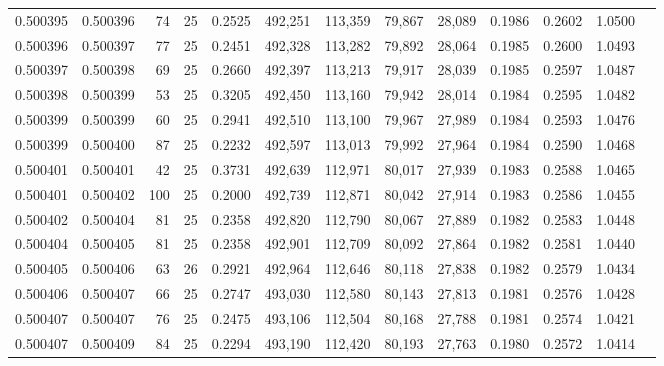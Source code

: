\begin{tabular}{rrrrrrrrrrrrr}
0.500395 & 0.500396 &  74 &  25 &                                     0.2525 & 492,251 & 113,359 &  79,867 &  28,089 & 0.1986 & 0.2602 & 1.0500 \\
0.500396 & 0.500397 &  77 &  25 &                                     0.2451 & 492,328 & 113,282 &  79,892 &  28,064 & 0.1985 & 0.2600 & 1.0493 \\
0.500397 & 0.500398 &  69 &  25 &                                     0.2660 & 492,397 & 113,213 &  79,917 &  28,039 & 0.1985 & 0.2597 & 1.0487 \\
0.500398 & 0.500399 &  53 &  25 &                                     0.3205 & 492,450 & 113,160 &  79,942 &  28,014 & 0.1984 & 0.2595 & 1.0482 \\
0.500399 & 0.500399 &  60 &  25 &                                     0.2941 & 492,510 & 113,100 &  79,967 &  27,989 & 0.1984 & 0.2593 & 1.0476 \\
0.500399 & 0.500400 &  87 &  25 &                                     0.2232 & 492,597 & 113,013 &  79,992 &  27,964 & 0.1984 & 0.2590 & 1.0468 \\
0.500401 & 0.500401 &  42 &  25 &                                     0.3731 & 492,639 & 112,971 &  80,017 &  27,939 & 0.1983 & 0.2588 & 1.0465 \\
0.500401 & 0.500402 & 100 &  25 &                                     0.2000 & 492,739 & 112,871 &  80,042 &  27,914 & 0.1983 & 0.2586 & 1.0455 \\
0.500402 & 0.500404 &  81 &  25 &                                     0.2358 & 492,820 & 112,790 &  80,067 &  27,889 & 0.1982 & 0.2583 & 1.0448 \\
0.500404 & 0.500405 &  81 &  25 &                                     0.2358 & 492,901 & 112,709 &  80,092 &  27,864 & 0.1982 & 0.2581 & 1.0440 \\
0.500405 & 0.500406 &  63 &  26 &                                     0.2921 & 492,964 & 112,646 &  80,118 &  27,838 & 0.1982 & 0.2579 & 1.0434 \\
0.500406 & 0.500407 &  66 &  25 &                                     0.2747 & 493,030 & 112,580 &  80,143 &  27,813 & 0.1981 & 0.2576 & 1.0428 \\
0.500407 & 0.500407 &  76 &  25 &                                     0.2475 & 493,106 & 112,504 &  80,168 &  27,788 & 0.1981 & 0.2574 & 1.0421 \\
0.500407 & 0.500409 &  84 &  25 &                                     0.2294 & 493,190 & 112,420 &  80,193 &  27,763 & 0.1980 & 0.2572 & 1.0414 \\

\end{tabular}
